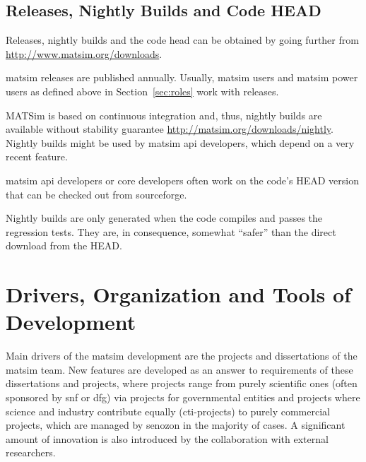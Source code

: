 \subsection{Releases, Nightly Builds and Code HEAD}
\label{sec:releases-builds}

Releases, nightly builds and the code head can be obtained by going further from \url{http://www.matsim.org/downloads}.

\gls{matsim} releases are published annually.
Usually, \gls{matsim} users and \gls{matsim} power users as defined above in Section~\ref{sec:roles} work with releases. 

MATSim is based on continuous integration and, thus, nightly builds are available without stability guarantee \url{http://matsim.org/downloads/nightly}. Nightly builds might be used by \gls{matsim} \gls{api} developers, which depend on a very recent feature. 

\gls{matsim} \gls{api} developers or core developers often work on the code's HEAD version that can be checked out from \gls{sourceforge}.

Nightly builds are only generated when the code compiles and passes the regression tests.  They are, in consequence, somewhat ``safer'' than the direct download from the HEAD.

\section{Drivers, Organization and Tools of Development}
Main drivers of the \gls{matsim} development are the projects and dissertations of the \gls{matsim} team. 
New features are developed as an answer to requirements of these dissertations and projects, where projects range 
%
from purely scientific ones (often sponsored by \gls{snf} or \gls{dfg}) 
%
via projects for governmental entities
%
and projects where science and industry contribute equally (\eg \gls{cti}-projects) 
%
to purely 
commercial projects, which are managed by \gls{senozon} in the majority of cases. 
%
A significant amount of innovation is also introduced by the collaboration with external researchers.

